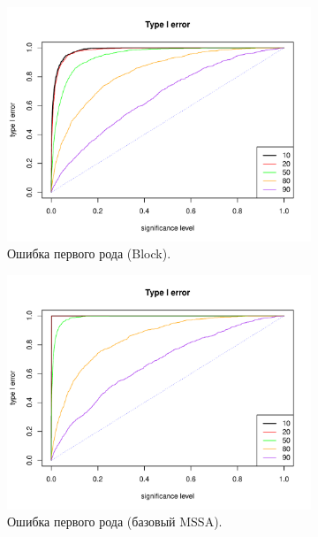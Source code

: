 \documentclass[specialist,
substylefile = spbu_report.rtx,
subf,href,colorlinks=true, 12pt]{disser}
\theoremstyle{definition}
\begin{document}
		\begin{figure}
		\captionsetup[subfigure]{justification=Centering}
		\begin{subfigure}[t]{0.45\textwidth}
			\centering
			\includegraphics[width=\textwidth]{type1error_block_fa.pdf}
			\caption{Ошибка первого рода (Block).}
		\end{subfigure}\hspace{\fill}
		\begin{subfigure}[t]{0.45\textwidth}
			\centering
			\includegraphics[width=\textwidth]{type1error_mssa_fa.pdf}
			\caption{Ошибка первого рода (базовый MSSA).}
		\end{subfigure}
		\bigskip
		\begin{subfigure}[t]{0.45\textwidth}

\end{subfigure}
\end{figure}
\end{document}
